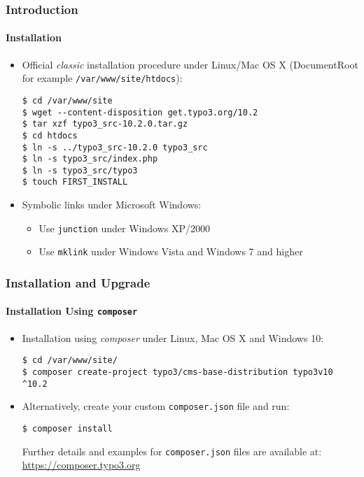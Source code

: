 
\begin{frame}[fragile]
	\frametitle{Introduction}
	\framesubtitle{Installation}

	\begin{itemize}
		\item Official \textit{classic} installation procedure under Linux/Mac OS X\newline
			(DocumentRoot for example \texttt{/var/www/site/htdocs}):
\begin{lstlisting}
$ cd /var/www/site
$ wget --content-disposition get.typo3.org/10.2
$ tar xzf typo3_src-10.2.0.tar.gz
$ cd htdocs
$ ln -s ../typo3_src-10.2.0 typo3_src
$ ln -s typo3_src/index.php
$ ln -s typo3_src/typo3
$ touch FIRST_INSTALL
\end{lstlisting}

		\item Symbolic links under Microsoft Windows:

			\begin{itemize}
				\item Use \texttt{junction} under Windows XP/2000
				\item Use \texttt{mklink} under Windows Vista and Windows 7 and higher
			\end{itemize}

	\end{itemize}
\end{frame}


\begin{frame}[fragile]
	\frametitle{Installation and Upgrade}
	\framesubtitle{Installation Using \texttt{composer}}

	\begin{itemize}
		\item Installation using \textit{composer} under Linux, Mac OS X and Windows 10:
\begin{lstlisting}
$ cd /var/www/site/
$ composer create-project typo3/cms-base-distribution typo3v10 ^10.2
\end{lstlisting}

		\item Alternatively, create your custom \texttt{composer.json} file and run:
\begin{lstlisting}
$ composer install
\end{lstlisting}

			Further details and examples for \texttt{composer.json} files are available at:\newline
			\smaller
				\href{https://composer.typo3.org}{https://composer.typo3.org}
			\normalsize

	\end{itemize}
\end{frame}

